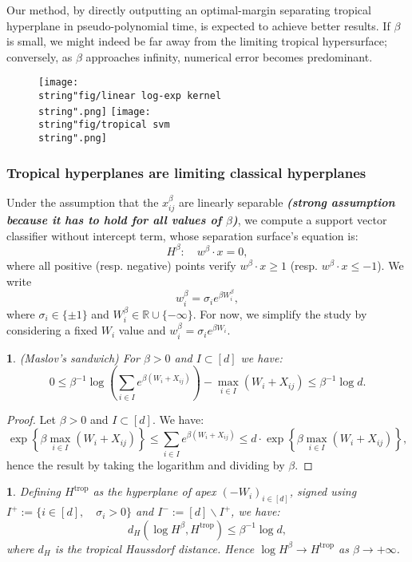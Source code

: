 \documentclass[oneside,english,a4paper]{amsart}
\numberwithin{equation}{section}
\numberwithin{figure}{section}
\theoremstyle{plain}
\theoremstyle{definition}
\theoremstyle{plain}
\newtheorem{prop}[thm]{\protect\propositionname}
\theoremstyle{remark}
\theoremstyle{plain}
\newtheorem{lem}[thm]{\protect\lemmaname}
\theoremstyle{definition}
\theoremstyle{definition}
\providecommand{\lemmaname}{Lemma}
\providecommand{\propositionname}{Proposition}
\begin{document}
Our method, by directly outputting an optimal-margin separating tropical
hyperplane in pseudo-polynomial time, is expected to achieve better
results. If $\beta$ is small, we might indeed be far away from the
limiting tropical hypersurface; conversely, as $\beta$ approaches
infinity, numerical error becomes predominant.

\begin{figure}[h]
\centering \texttt{[image: \\string"fig/linear log-exp kernel\\string".png]}
\texttt{[image: \\string"fig/tropical svm\\string".png]} 
\end{figure}


\subsubsection{Tropical hyperplanes are limiting classical hyperplanes}

Under the assumption that the $x_{ij}^{\beta}$ are linearly separable
\textbf{\emph{(strong assumption because it has to hold for all values
of $\beta$)}}, we compute a support vector classifier without intercept
term, whose separation surface's equation is: 
\[
H^{\beta}:\quad w^{\beta}\cdot x=0,
\]
where all positive (resp. negative) points verify $w^{\beta}\cdot x\ge1$
(resp. $w^{\beta}\cdot x\le-1$). We write 
\[
w_{i}^{\beta}=\sigma_{i}e^{\beta W_{i}^{\beta}},
\]
where $\sigma_{i}\in\{\pm1\}$ and $W_{i}^{\beta}\in\mathbb{R}\cup\{-\infty\}$.
For now, we simplify the study by considering a fixed $W_{i}$ value
and $w_{i}^{\beta}=\sigma_{i}e^{\beta W_{i}}$. 
\begin{lem}
(Maslov's sandwich) For $\beta>0$ and $I\subset[d]$ we have: 
\[
0\leq\beta^{-1}\log\left(\sum_{i\in I}e^{\beta(W_{i}+X_{ij})}\right)-\max_{i\in I}(W_{i}+X_{ij})\le\beta^{-1}\log d.
\]
\end{lem}

\begin{proof}
Let $\beta>0$ and $I\subset[d]$. We have: 
\[
\exp\left\{ \beta\max_{i\in I}\left(W_{i}+X_{ij}\right)\right\} \le\sum_{i\in I}e^{\beta(W_{i}+X_{ij})}\le d\cdot\exp\left\{ \beta\max_{i\in I}\left(W_{i}+X_{ij}\right)\right\} ,
\]
hence the result by taking the logarithm and dividing by $\beta$. 
\end{proof}
\begin{prop}
Defining $H^{\text{trop}}$ as the hyperplane of apex $(-W_{i})_{i\in[d]}$,
signed using $I^{+}:=\{i\in[d],\quad\sigma_{i}>0\}$ and $I^{-}:=[d]\backslash I^{+}$,
we have: 
\[
d_{H}\left(\log H^{\beta},H^{\text{trop}}\right)\le\beta^{-1}\log d,
\]
where $d_{H}$ is the tropical Haussdorf distance. Hence $\log H^{\beta}\longrightarrow H^{\text{trop}}$
as $\beta\longrightarrow+\infty$. 
\end{prop}
\end{document}

